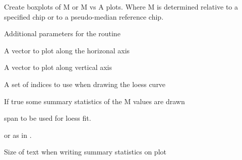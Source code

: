 \begin{Description}\relax
Create boxplots of M or M vs A plots. Where M is determined relative
to a specified chip or to a pseudo-median reference chip.
\end{Description}
\begin{Arguments}
\begin{ldescription}
\item[\code{...}] Additional parameters for the routine
\item[\code{A}] A vector to plot along the horizonal axis
\item[\code{M}] A vector to plot along vertical axis
\item[\code{subset}] A set of indices to use when drawing the loess curve
\item[\code{show.statistics}] If true some summary statistics of the M values
are drawn
\item[\code{span}] span to be used for loess fit.
\item[\code{family.loess}]  or  as in
.
\item[\code{cex}] Size of text when writing summary statistics on plot
\end{ldescription}
\end{Arguments}
\begin{SeeAlso}\relax
{}
\end{SeeAlso}

